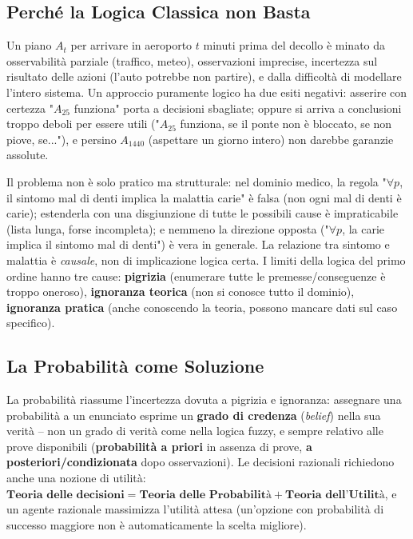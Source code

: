 \documentclass[a4paper,11pt]{article}
\begin{document}
\subsection{Perché la Logica Classica non Basta}

Un piano $A_t$ per arrivare in aeroporto $t$ minuti prima del decollo è minato da osservabilità parziale (traffico, meteo), osservazioni imprecise, incertezza sul risultato delle azioni (l'auto potrebbe non partire), e dalla difficoltà di modellare l'intero sistema. Un approccio puramente logico ha due esiti negativi: asserire con certezza "$A_{25}$ funziona" porta a decisioni sbagliate; oppure si arriva a conclusioni troppo deboli per essere utili ("$A_{25}$ funziona, se il ponte non è bloccato, se non piove, se..."), e persino $A_{1440}$ (aspettare un giorno intero) non darebbe garanzie assolute.

Il problema non è solo pratico ma strutturale: nel dominio medico, la regola "$\forall p$, il sintomo mal di denti implica la malattia carie" è falsa (non ogni mal di denti è carie); estenderla con una disgiunzione di tutte le possibili cause è impraticabile (lista lunga, forse incompleta); e nemmeno la direzione opposta ("$\forall p$, la carie implica il sintomo mal di denti") è vera in generale. La relazione tra sintomo e malattia è \emph{causale}, non di implicazione logica certa. I limiti della logica del primo ordine hanno tre cause: \textbf{pigrizia} (enumerare tutte le premesse/conseguenze è troppo oneroso), \textbf{ignoranza teorica} (non si conosce tutto il dominio), \textbf{ignoranza pratica} (anche conoscendo la teoria, possono mancare dati sul caso specifico).

\subsection{La Probabilità come Soluzione}

La probabilità riassume l'incertezza dovuta a pigrizia e ignoranza: assegnare una probabilità a un enunciato esprime un \textbf{grado di credenza} (\emph{belief}) nella sua verità -- non un grado di verità come nella logica fuzzy, e sempre relativo alle prove disponibili (\textbf{probabilità a priori} in assenza di prove, \textbf{a posteriori/condizionata} dopo osservazioni). Le decisioni razionali richiedono anche una nozione di utilità: $\textbf{Teoria delle decisioni} = \textbf{Teoria delle Probabilità} + \textbf{Teoria dell'Utilità}$, e un agente razionale massimizza l'utilità attesa (un'opzione con probabilità di successo maggiore non è automaticamente la scelta migliore).
\end{document}
